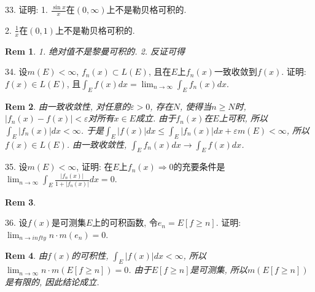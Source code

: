 \documentclass[UTF8]{article}
\newtheorem*{remark}{Rem}
\begin{document}
    33. 证明: 1. $\frac{\sin x}{x}$在$(0,\infty)$上不是勒贝格可积的.\par 
    2. $\frac{1}{x}$在$(0,1)$上不是勒贝格可积的.\par
    \begin{remark}
        1. 绝对值不是黎曼可积的. 2. 反证可得
    \end{remark}
    34. 设$m(E)<\infty$, $f_n(x)\subset L(E)$, 且在$E$上$f_n(x)$一致收敛到$f(x)$. 证明: $f(x)\in L(E)$, 且$\int_{E}f(x)dx=\lim_{n \to \infty}\int_{E}f_n(x)dx$.\par
    \begin{remark}
        由一致收敛性, 对任意的$\varepsilon>0$, 存在$N$, 使得当$n\geqslant N$时, $|f_n(x)-f(x)|<\varepsilon$对所有$x\in E$成立. 由于$f_n(x)$在$E$上可积, 所以$\int_{E}|f_n(x)|dx<\infty$. 于是$\int_{E}|f(x)|dx\leqslant \int_{E}|f_n(x)|dx+\varepsilon m(E)<\infty$, 所以$f(x)\in L(E)$. 由一致收敛性, $\int_{E}f_n(x)dx\to \int_{E}f(x)dx$.\par
    \end{remark}
    35. 设$m(E)<\infty$, 证明: 在$E$上$f_n(x)\Rightarrow 0$的充要条件是$\lim_{n \to \infty}\int_{E}\frac{|f_n(x)|}{1+|f_n(x)|}dx=0$.\par
    \begin{remark}
        
    \end{remark}
    36. 设$f(x)$是可测集$E$上的可积函数, 令$e_n=E\left[f\geqslant n\right]$. 证明: $\lim_{n \to infty}n\cdot m(e_n) =0$.\par
    \begin{remark}
        由$f(x)$的可积性, $\int_{E}|f(x)|dx<\infty$, 所以$\lim_{n \to \infty}n\cdot m(E\left[f\geqslant n\right])=0$. 由于$E\left[f\geqslant n\right]$是可测集, 所以$m(E\left[f\geqslant n\right])$是有限的, 因此结论成立.\par
    \end{remark}
\end{document}
